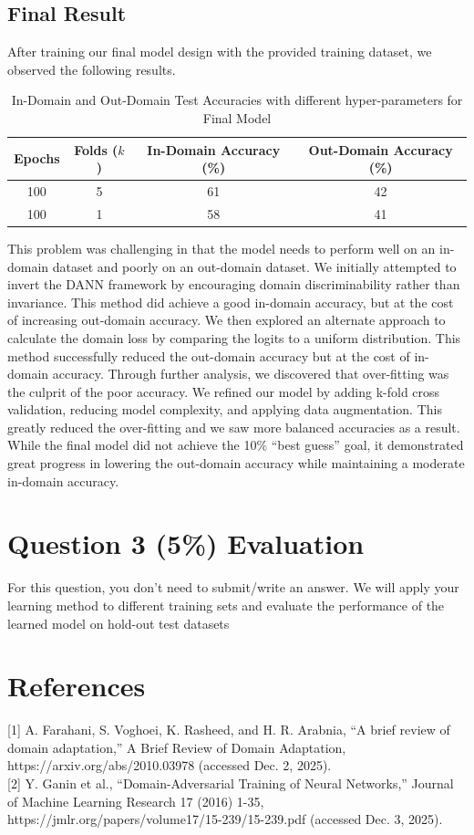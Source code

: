 \documentclass[12pt]{article}
\newcounter{ques}
\begin{document}
  \subsection*{Final Result}
  After training our final model design with the provided training dataset, we observed the following results.
  \begin{table}[H]
    \centering
    \begin{tabular}{|c|c|c|c|}
      \hline
      Epochs & Folds ($k$) & In-Domain Accuracy (\%) & Out-Domain Accuracy (\%)\\
      \hline
      100 & 5 & 61 & 42\\
      100 & 1 & 58 & 41\\
      \hline
    \end{tabular}
    \caption{In-Domain and Out-Domain Test Accuracies with different hyper-parameters for Final Model}
    \label{tab:in-out-domain-acc-v1}
  \end{table}

  This problem was challenging in that the model needs to perform well on an in-domain dataset and poorly on an out-domain dataset. We initially attempted to invert the DANN framework by encouraging domain discriminability rather than invariance. This method did achieve a good in-domain accuracy, but at the cost of increasing out-domain accuracy. We then explored an alternate approach to calculate the domain loss by comparing the logits to a uniform distribution. This method successfully reduced the out-domain accuracy but at the cost of in-domain accuracy. Through further analysis, we discovered that over-fitting was the culprit of the poor accuracy. We refined our model by adding k-fold cross validation, reducing model complexity, and applying data augmentation. This greatly reduced the over-fitting and we saw more balanced accuracies as a result.  \\[1em]
  While the final model did not achieve the 10\% ``best guess'' goal, it demonstrated great progress in lowering the out-domain accuracy while maintaining a moderate in-domain accuracy.

\section*{Question 3 (5\%) Evaluation} 
For this question, you don't need to submit/write an answer. We will apply your learning method to different training sets and evaluate the performance of the learned model on hold-out test datasets
\pagebreak
\section*{References}
[1] A. Farahani, S. Voghoei, K. Rasheed, and H. R. Arabnia, “A brief review of domain adaptation,” A Brief Review of Domain Adaptation, https://arxiv.org/abs/2010.03978 (accessed Dec. 2, 2025). \\[1em]
[2] Y. Ganin et al., “Domain-Adversarial Training of Neural Networks,” Journal of Machine Learning Research 17 (2016) 1-35, https://jmlr.org/papers/volume17/15-239/15-239.pdf (accessed Dec. 3, 2025). 
\end{document}
